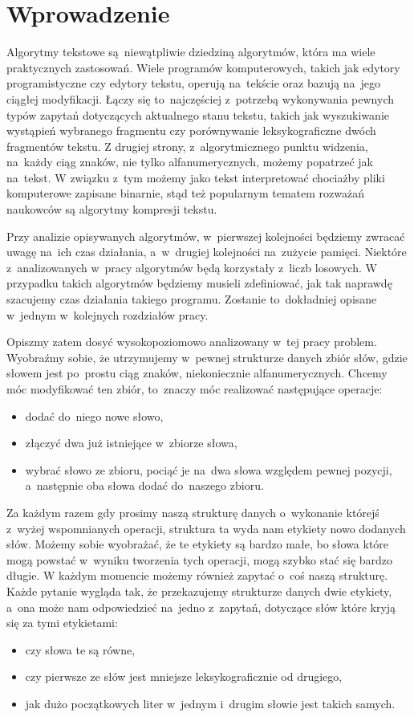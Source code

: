 \documentclass[declaration,shortabstract]{iithesis}
\author         {Michał Górniak}
\date          {11 września 2020}
\theoremstyle{definition} \newtheorem{definition}{Definicja}[chapter]
\theoremstyle{plain} \newtheorem{remark}[definition]{Obserwacja}
\theoremstyle{plain} \newtheorem{theorem}[definition]{Twierdzenie}
\theoremstyle{plain} \newtheorem{example}{Przykład}[definition]
\theoremstyle{plain} \newtheorem{lemma}[definition]{Lemat}
\begin{document}
\chapter{Wprowadzenie}

Algorytmy tekstowe są~niewątpliwie dziedziną algorytmów, która ma wiele praktycznych zastosowań. Wiele programów komputerowych, takich jak edytory programistyczne czy edytory tekstu, operują na~tekście oraz bazują na~jego ciągłej modyfikacji. Łączy się to~najczęściej z~potrzebą wykonywania pewnych typów zapytań dotyczących aktualnego stanu tekstu, takich jak wyszukiwanie wystąpień wybranego fragmentu czy porównywanie leksykograficzne dwóch fragmentów tekstu. Z drugiej strony, z~algorytmicznego punktu widzenia, na~każdy ciąg znaków, nie tylko alfanumerycznych, możemy popatrzeć jak na~tekst. W związku z~tym możemy jako tekst interpretować chociażby pliki komputerowe zapisane binarnie, stąd też popularnym tematem rozważań naukowców są algorytmy kompresji tekstu.

Przy analizie opisywanych algorytmów, w~pierwszej kolejności będziemy zwracać uwagę na~ich czas działania, a~w~drugiej kolejności na~zużycie pamięci. Niektóre z~analizowanych w~pracy algorytmów będą korzystały z~liczb losowych. W przypadku takich algorytmów będziemy musieli zdefiniować, jak tak naprawdę szacujemy czas działania takiego programu. Zostanie to~dokładniej opisane w~jednym w~kolejnych rozdziałów pracy.

Opiszmy zatem dosyć wysokopoziomowo analizowany w~tej pracy problem. Wyobraźmy sobie, że utrzymujemy w~pewnej strukturze danych zbiór słów, gdzie słowem jest po~prostu ciąg znaków, niekoniecznie alfanumerycznych. Chcemy móc modyfikować ten zbiór, to~znaczy móc realizować następujące operacje: 
\begin{itemize}
    \item dodać do~niego nowe słowo, 
    \item złączyć dwa już istniejące w~zbiorze słowa,
    \item wybrać słowo ze zbioru, pociąć je na~dwa słowa względem pewnej pozycji, a~następnie oba słowa dodać do~naszego zbioru. 
\end{itemize}
Za każdym razem gdy prosimy naszą strukturę danych o~wykonanie którejś z~wyżej wspomnianych operacji, struktura ta wyda nam etykiety nowo dodanych słów. Możemy sobie wyobrażać, że te etykiety są bardzo małe, bo słowa które mogą powstać w~wyniku tworzenia tych operacji, mogą szybko stać się bardzo długie. W każdym momencie możemy również zapytać o~coś naszą strukturę. Każde pytanie wygląda tak, że przekazujemy strukturze danych dwie etykiety, a~ona może nam odpowiedzieć na~jedno z~zapytań, dotyczące słów które kryją się za tymi etykietami:
\begin{itemize}
    \item czy słowa te są równe,
    \item czy pierwsze ze słów jest mniejsze leksykograficznie od drugiego,
    \item jak dużo początkowych liter w~jednym i~drugim słowie jest takich samych.
\end{itemize}
\end{document}
